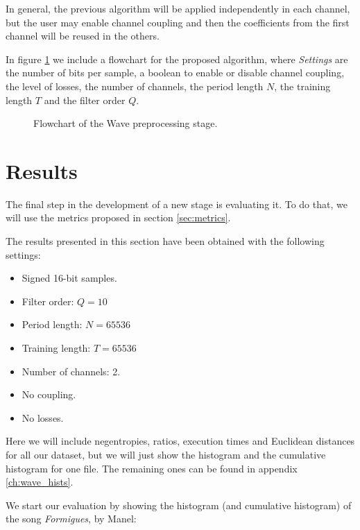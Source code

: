 In general, the previous algorithm will be applied independently in each channel, but the user may enable channel coupling and then the coefficients from the first channel will be reused in the others.

In figure \ref{fig:wave_flowchart} we include a flowchart for the proposed algorithm, where \textit{Settings} are the number of bits per sample, a boolean to enable or disable channel coupling, the level of losses, the number of channels, the period length $N$, the training length $T$ and the filter order $Q$.

\pagebreak
\begin{figure}[h!]
	\begin{center}
		\scalebox{.93}{}
	\end{center}
	\caption{Flowchart of the Wave preprocessing stage.}
	\label{fig:wave_flowchart}
\end{figure}

\section{Results} \label{sec:wave_results}
The final step in the development of a new stage is evaluating it. To do that, we will use the metrics proposed in section \ref{sec:metrics}.

The results presented in this section have been obtained with the following settings:
\begin{itemize}
	\item Signed 16-bit samples.
	\item Filter order: $Q = 10$
	\item Period length: $N = 65536$
	\item Training length: $T = 65536$
	\item Number of channels: 2.
	\item No coupling.
	\item No losses.
\end{itemize}

Here we will include negentropies, ratios, execution times and Euclidean distances for all our dataset, but we will just show the histogram and the cumulative histogram for one file. The remaining ones can be found in appendix \ref{ch:wave_hists}.

We start our evaluation by showing the histogram (and cumulative histogram) of the song \textit{Formigues}, by Manel:


